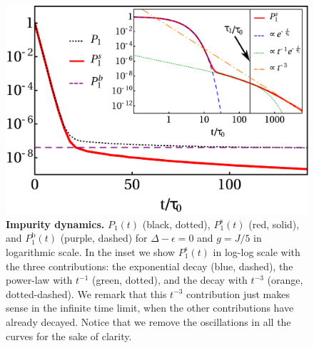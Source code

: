 \documentclass[aps,pra,twocolumn,floatfix,superscriptaddress]{revtex4-1}%
\begin{document}
\begin{figure}[thb!]
\includegraphics[width=1.0\columnwidth]{P_Delta_0_g_0_2.pdf}
\caption{{\bf Impurity dynamics.} $P_1(t)$ (black, dotted), $P_1^\text{s}(t)$ (red, solid), and $P_1^\text{b}(t)$ (purple, dashed) for $\Delta-\epsilon=0$ and $g=J/5$ in logarithmic scale. In the inset we show $P_1^\text{s}(t)$ in log-log scale with the three contributions: the exponential decay (blue, dashed), the power-law with $t^{-1}$ (green, dotted), and the decay with $t^{-3}$ (orange, dotted-dashed). We remark that this $t^{-3}$ contribution just makes sense in the infinite time limit, when the other contributions have already decayed. Notice that we remove the oscillations in all the curves for the sake of clarity.}\label{fig:qubit_dynamics}
\end{figure}
\end{document}
